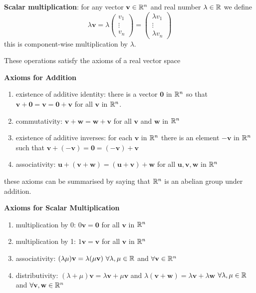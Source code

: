 \documentclass[10pt, a4paper]{article}
\newcommand{\mbf}[1]{\mathbf{#1}}
\begin{document}
\textbf{Scalar multiplication}: for any vector $\mathbf{v} \in \mathbb{R} ^ n$ and real number $\lambda \in \mathbb{R}$ we define
\[
\lambda\mathbf{v} =
\lambda\begin{pmatrix}
    v_1 \\
    \vdots \\
    v_n
\end{pmatrix}
=
\begin{pmatrix}
    \lambda v_1 \\
    \vdots \\
    \lambda v_n
\end{pmatrix}
\]
this is component-wise multiplication by $\lambda$.

\begin{proposition}
    These operations satisfy the axioms of a real vector space
\end{proposition}

{\large \textbf{Axioms for Addition}}
\begin{enumerate}[label = (\roman*)]
    \item existence of additive identity: there is a vector $\mathbf{0}$ in $\mathbb{R} ^ n$ so that $\mathbf{v} + \mathbf{0} = \mathbf{v} = \mathbf{0} + \mathbf{v}$ for all $\mathbf{v}$ in $\mathbb{R} ^ n$.
    \item commutativity: $\mbf{v + w = w + v}$ for all $\mathbf{v}$ and $\mathbf{w}$ in $\mathbb{R} ^ n$
    \item existence of additive inverses: for each $\mbf{v}$ in $\mathbb{R} ^ n$ there is an element $-\mbf{v}$ in $\mathbb{R} ^ n$ such that $\mbf{v + (-v) = 0 = (-v) + v}$
    \item associativity: $\mbf{u + (v + w) = (u + v) + w}$ for all $\mbf{u, v, w}$ in $\mathbb{R} ^ n$
\end{enumerate}
these axioms can be summarised by saying that $\mathbb{R} ^ n$ is an abelian group under addition.


{\large\textbf{Axioms for Scalar Multiplication}}
\begin{enumerate}[label = (\roman*)]
    \item multiplication by 0: $0\mbf{v = 0}$ for all $\mbf{v}$ in $\mathbb{R} ^ n$
    \item multiplication by 1: $1\mbf{v = v}$ for all $\mbf{v}$ in $\mathbb{R} ^ n$
    \item associativity: $(\lambda\mu)\mbf{v} = \lambda (\mu\mbf{v})\ \forall \lambda, \mu \in \R$ and $\forall \mbf{v} \in \R ^ n$
    \item distributivity: $(\lambda + \mu)\mbf{v} = \lambda\mbf{v} + \mu\mbf{v}$ and $\lambda (\mbf{v + w}) = \lambda\mbf{v} + \lambda\mbf{w}$ $\forall \lambda, \mu \in \mathbb{R}$ and $\forall \mbf{v, w} \in \R ^ n$
\end{enumerate}
\end{document}
